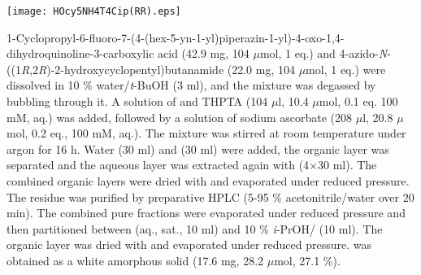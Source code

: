 
\begin{scheme}[H]
	\begin{center}
		\texttt{[image: HOcy5NH4T4Cip(RR).eps]}
	\end{center}
\end{scheme}

1-Cyclopropyl-6-fluoro-7-(4-(hex-5-yn-1-yl)piperazin-1-yl)-4-oxo-1,4\hyp{}dihydro\-quinoline-3-carboxylic acid  (42.9 mg, 104 $\mu$mol, 1 eq.) and 4\hyp{}azido\hyp{}\textit{N}\hyp{}((1\textit{R},2\textit{R})\hyp{}2\hyp{}hydroxycyclopentyl)butanamide  (22.0 mg, 104 $\mu$mol, 1 eq.) were dissolved in 10 \% water/\textit{t}-BuOH (3 ml), and the mixture was degassed by bubbling  through it. 
A solution of  and THPTA (104 $\mu$l, 10.4 $\mu$mol, 0.1 eq. 100 mM, aq.) was added, followed by a solution of sodium ascorbate (208 $\mu$l, 20.8 $\mu$mol, 0.2 eq., 100 mM, aq.). 
The mixture was stirred at room temperature under argon for 16 h. Water (30 ml) and  (30 ml) were added, the organic layer was separated and the aqueous layer was extracted again with  (4$\times$30 ml). The combined organic layers were dried with  and evaporated under reduced pressure. The residue was purified by preparative HPLC (5-95 \% acetonitrile/water over 20 min). The combined pure fractions were evaporated under reduced pressure and then partitioned between  (aq., sat., 10 ml) and 10 \% \textit{i}-PrOH/ (10 ml). The organic layer was dried with  and evaporated under reduced pressure.
 was obtained as a white amorphous solid (17.6 mg, 28.2 $\mu$mol, 27.1 \%).
\\[1\baselineskip]
\\[1\baselineskip]
